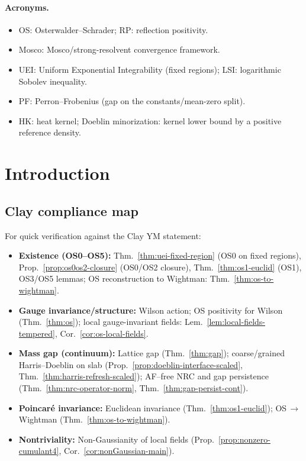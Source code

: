 \documentclass[11pt]{amsart}
\theoremstyle{plain}
\theoremstyle{definition}
\theoremstyle{remark}
\begin{document}
\paragraph{Acronyms.}
\begin{itemize}
  \item OS: Osterwalder--Schrader; RP: reflection positivity.
  \item Mosco: Mosco/strong-resolvent convergence framework.
  \item UEI: Uniform Exponential Integrability (fixed regions); LSI: logarithmic Sobolev inequality.
  \item PF: Perron--Frobenius (gap on the constants/mean-zero split).
  \item HK: heat kernel; Doeblin minorization: kernel lower bound by a positive reference density.
\end{itemize}

\section{Introduction}
\subsection*{Clay compliance map}
For quick verification against the Clay YM statement:
\begin{itemize}
  \item \textbf{Existence (OS0--OS5):} Thm.~\ref{thm:uei-fixed-region} (OS0 on fixed regions), Prop.~\ref{prop:os0os2-closure} (OS0/OS2 closure), Thm.~\ref{thm:os1-euclid} (OS1), OS3/OS5 lemmas; OS reconstruction to Wightman: Thm.~\ref{thm:os-to-wightman}.
  \item \textbf{Gauge invariance/structure:} Wilson action; OS positivity for Wilson (Thm.~\ref{thm:os}); local gauge-invariant fields: Lem.~\ref{lem:local-fields-tempered}, Cor.~\ref{cor:os-local-fields}.
  \item \textbf{Mass gap (continuum):} Lattice gap (Thm.~\ref{thm:gap}); coarse/grained Harris--Doeblin on slab (Prop.~\ref{prop:doeblin-interface-scaled}, Thm.~\ref{thm:harris-refresh-scaled}); AF--free NRC and gap persistence (Thm.~\ref{thm:nrc-operator-norm}, Thm.~\ref{thm:gap-persist-cont}).
  \item \textbf{Poincar\'e invariance:} Euclidean invariance (Thm.~\ref{thm:os1-euclid}); OS\,$\to$\,Wightman (Thm.~\ref{thm:os-to-wightman}).
  \item \textbf{Nontriviality:} Non-Gaussianity of local fields (Prop.~\ref{prop:nonzero-cumulant4}, Cor.~\ref{cor:nonGaussian-main}).
\end{itemize}
\end{document}
